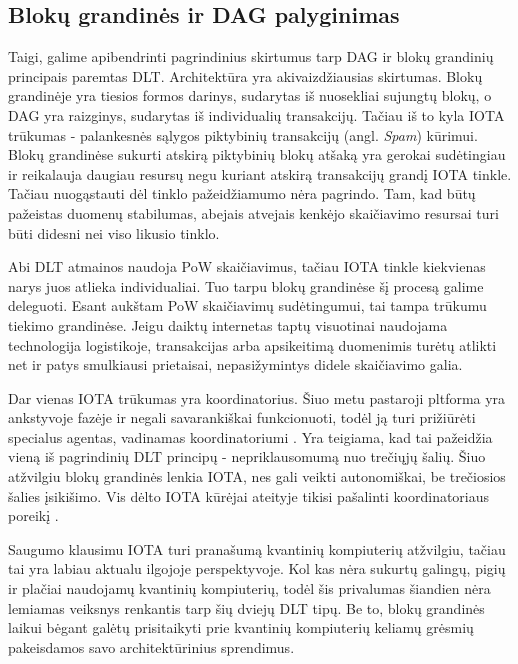 \subsection{Blokų grandinės ir DAG palyginimas}

Taigi, galime apibendrinti pagrindinius skirtumus tarp DAG ir blokų grandinių principais paremtas DLT. Architektūra yra akivaizdžiausias skirtumas. Blokų grandinėje yra tiesios formos darinys, sudarytas iš nuosekliai sujungtų blokų, o DAG yra raizginys, sudarytas iš individualių transakcijų. Tačiau iš to kyla IOTA trūkumas - palankesnės sąlygos piktybinių transakcijų (angl. \textit{Spam}) kūrimui. Blokų grandinėse sukurti atskirą piktybinių blokų atšaką yra gerokai sudėtingiau ir reikalauja daugiau resursų negu kuriant atskirą transakcijų grandį IOTA tinkle. Tačiau nuogąstauti dėl tinklo pažeidžiamumo nėra pagrindo. Tam, kad būtų pažeistas duomenų stabilumas, abejais atvejais kenkėjo skaičiavimo resursai turi būti didesni nei viso likusio tinklo.

Abi DLT atmainos naudoja PoW skaičiavimus, tačiau IOTA tinkle kiekvienas narys juos atlieka individualiai. Tuo tarpu blokų grandinėse šį procesą galime deleguoti. Esant aukštam PoW skaičiavimų sudėtingumui, tai tampa trūkumu tiekimo grandinėse. Jeigu daiktų internetas taptų visuotinai naudojama technologija logistikoje, transakcijas arba apsikeitimą duomenimis turėtų atlikti net ir patys smulkiausi prietaisai, nepasižymintys didele skaičiavimo galia.

Dar vienas IOTA trūkumas yra koordinatorius. Šiuo metu pastaroji pltforma yra ankstyvoje fazėje ir negali savarankiškai funkcionuoti, todėl ją turi prižiūrėti specialus agentas, vadinamas koordinatoriumi \cite{bramas2018stability}. Yra teigiama, kad tai pažeidžia vieną iš pagrindinių DLT principų - nepriklausomumą nuo trečiųjų šalių. Šiuo atžvilgiu blokų grandinės lenkia IOTA, nes gali veikti autonomiškai, be trečiosios šalies įsikišimo. Vis dėlto IOTA kūrėjai ateityje tikisi pašalinti koordinatoriaus poreikį \cite{bramas2018stability}.

Saugumo klausimu IOTA turi pranašumą kvantinių kompiuterių atžvilgiu, tačiau tai yra labiau aktualu ilgojoje perspektyvoje. Kol kas nėra sukurtų galingų, pigių ir plačiai naudojamų kvantinių kompiuterių, todėl šis privalumas šiandien nėra lemiamas veiksnys renkantis tarp šių dviejų DLT tipų. Be to, blokų grandinės laikui bėgant galėtų prisitaikyti prie kvantinių kompiuterių keliamų grėsmių pakeisdamos savo architektūrinius sprendimus.

